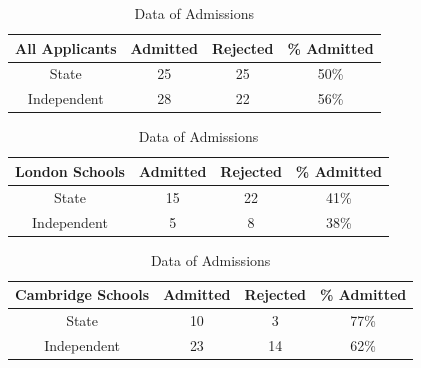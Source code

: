\begin{table}[ht!]
    \centering
    \begin{tabular}{cccc}
        All Applicants & Admitted & Rejected & \% Admitted \\
        \hline
        State & 25 & 25 & 50\% \\
        Independent & 28 & 22 & 56\%
    \end{tabular}
    
    \vspace{1em}

    \begin{tabular}{cccc}
        London Schools & Admitted & Rejected & \% Admitted \\
        \hline
        State & 15 & 22 & 41\% \\
        Independent & 5 & 8 & 38\%
    \end{tabular}
    
    \vspace{1em}

    \begin{tabular}{cccc}
        Cambridge Schools & Admitted & Rejected & \% Admitted \\
        \hline
        State & 10 & 3 & 77\% \\
        Independent & 23 & 14 & 62\%
    \end{tabular}

    \caption{Data of Admissions}
    \label{tab:simpson-paradox-data}
\end{table}

